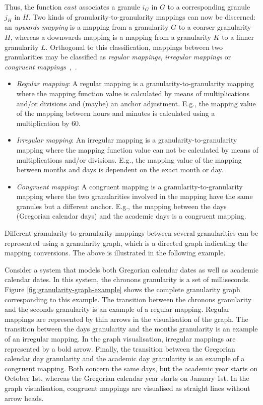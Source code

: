 Thus, the function $cast$ associates a granule $i_G$ in $G$ to a corresponding granule $j_H$ in $H$. Two kinds of granularity-to-granularity mappings can now be discerned: an \emph{upwards mapping} is a mapping from a granularity $G$ to a coarser granularity $H$, whereas a downwards mapping is a mapping from a granularity $K$ to a finner granularity $L$. Orthogonal to this classification, mappings between two granularities may be classified as \emph{regular mappings}, \emph{irregular mappings} or \emph{congruent mappings}~\cite{Lin97},~\cite{DyresonSnodgrass1994}.
\begin{itemize}
\item
\emph{Regular mapping}: A regular mapping is a granularity-to-granularity mapping where the mapping function value is calculated by means of multiplications and/or divisions and (maybe) an anchor adjustment. E.g., the mapping value of the mapping between hours and minutes is calculated using a multiplication by $60$. 
\item
\emph{Irregular mapping}: An irregular mapping is a granularity-to-granularity mapping where the mapping function value can not be calculated by means of multiplications and/or divisions. E.g., the mapping value of the mapping between months and days is dependent on the exact month or day. 
\item
\emph{Congruent mapping}: A congruent mapping is a granularity-to-granularity mapping where the two granularities involved in the mapping have the same granules but a different anchor. E.g., the mapping between the days (Gregorian calendar days) and the academic days is a congruent mapping.
\end{itemize}

Different granularity-to-granularity mappings between several granularities can be represented using a granularity graph, which is a directed graph indicating the mapping conversions. The above is illustrated in the following example.

\begin{example}
\label{examplegrangraph}
Consider a system that models both Gregorian calendar dates as well as academic calendar dates. In this system, the chronons granularity is a set of milliseconds. Figure \ref{fig:granularity-graph-example} shows the complete granularity graph corresponding to this example. The transition between the chronons granularity and the seconds granularity is an example of a regular mapping. Regular mappings are represented by thin arrows in the visualisation of the graph. The transition between the days granularity and the months granularity is an example of an irregular mapping. In the graph visualisation, irregular mappings are represented by a bold arrow. Finally, the transition between the Gregorian calendar day granularity and the academic day granularity is an example of a congruent mapping. Both concern the same days, but the academic year starts on October 1st, whereas the Gregorian calendar year starts on January 1st. In the graph visualisation, congruent mappings are visualised as straight lines without arrow heads.

\end{example}



